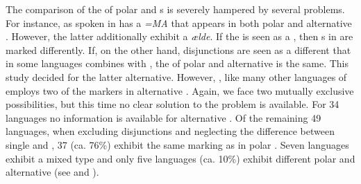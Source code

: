 The comparison of the  of polar and s is severely hampered by several problems. For instance,  as spoken in  has a  \textit{=MA} that appears in both polar and alternative . However, the latter additionally exhibit a  \textit{ælde}. If the  is seen as a , then s in  are marked differently. If, on the other hand, disjunctions are seen as a different  that in some languages combines with , the  of polar and alternative  is the same. This study decided for the latter alternative. However, , like many other languages of  employs two of the  markers in alternative . Again, we face two mutually exclusive possibilities, but this time no clear solution to the problem is available. For 34 languages no information is available for alternative . Of the remaining 49 languages, when excluding disjunctions and neglecting the difference between single and , 37 (ca. 76\%) exhibit the same marking as in polar . Seven languages exhibit a mixed type and only five languages (ca. 10\%) exhibit different polar and alternative  (see  and ).

